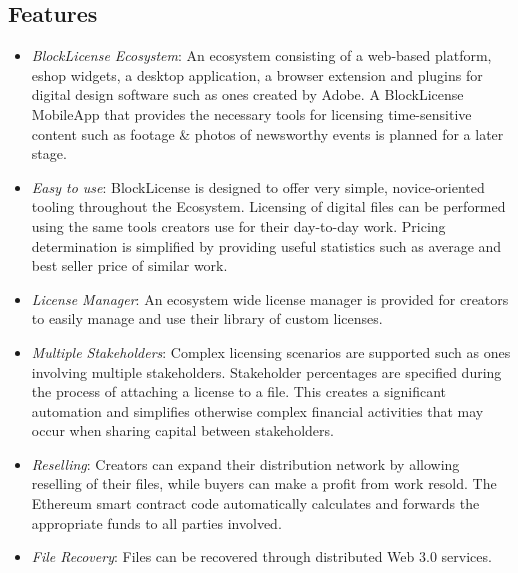 \subsection{Features}

\begin{itemize}
\item \textit{BlockLicense Ecosystem}: An ecosystem consisting of a web-based platform, eshop widgets, a desktop application, a browser extension and plugins for digital design software such as ones created by Adobe. A BlockLicense MobileApp  that provides the necessary tools for licensing time-sensitive content such as footage \& photos of newsworthy events is planned for a later stage.
\bigskip
\item \textit{Easy to use}: BlockLicense is designed to offer very simple, novice-oriented tooling throughout the Ecosystem. Licensing of digital files can be performed using the same tools creators use for their day-to-day work. Pricing determination is simplified by providing useful statistics such as average and best seller price of similar work.
\bigskip
\item \textit{License Manager}: An ecosystem wide license manager is provided for creators to easily manage and use their library of custom licenses.
\bigskip
\item \textit{Multiple Stakeholders}: Complex licensing scenarios are supported such as ones involving multiple stakeholders. Stakeholder percentages are specified during the process of attaching a license to a file. This creates a significant automation and simplifies otherwise complex financial activities that may occur when sharing capital between stakeholders.
\bigskip
\item \textit{Reselling}: Creators can expand their distribution network by allowing reselling of their files, while buyers can make a profit from work resold. The Ethereum smart contract code automatically calculates and forwards the appropriate funds to all parties involved. 
\bigskip
\item \textit{File Recovery}: Files can be recovered through distributed Web 3.0 services.
\end{itemize}